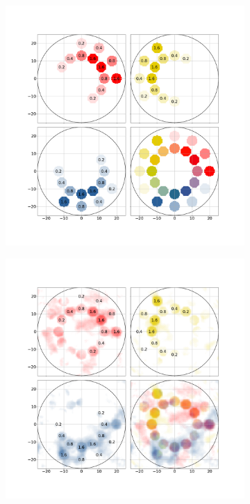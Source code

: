\documentclass[12pt]{spieman}  %
\begin{document}
\begin{spacing}{1}
\begin{figure}    
    \centering
    \vspace{-14mm}
    \begin{subfigure}[t]{.35\textwidth}
      \centering
      \includegraphics[clip, trim={4cm 4.8cm 4cm 5cm}, scale = 0.15]{figures/RGB_x_GT.png}
      \caption{}
      \label{fig:x_GT}
    \end{subfigure}%
    \begin{subfigure}[t]{.35\textwidth}
      \centering
      \includegraphics[clip, trim={4cm 4.8cm 4cm 5cm}, scale = 0.15]{figures/RGB_xi3.png}
      \caption{}
      \label{fig:xi_3}
    \end{subfigure}%
    \vspace{4mm}
    

\end{figure}
\end{spacing}
\end{document}
